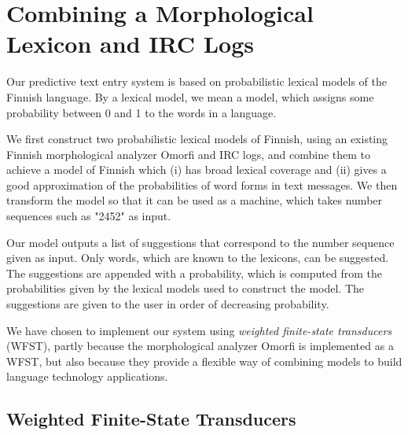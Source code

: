 \documentclass[a4paper,conference]{IEEEtran}
\begin{document}
\section{Combining a Morphological Lexicon and IRC Logs}
\label{sec:methods}

Our predictive text entry system is based on probabilistic lexical
models of the Finnish language. By a lexical model, we mean a model,
which assigns some probability between 0 and 1 to the words in a
language.

We first construct two probabilistic lexical models of Finnish,
using an existing Finnish morphological analyzer Omorfi and IRC logs, and combine
them to achieve a model of Finnish which (i) has broad lexical
coverage and (ii) gives a good approximation of the probabilities of
word forms in text messages. We then transform the model so that it
can be used as a machine, which takes number sequences such as "2452"
as input. 

Our model outputs a list of suggestions that correspond to the number
sequence given as input. Only words, which are known to the lexicons,
can be suggested. The suggestions are appended with a probability, which is
computed from the probabilities given by the lexical models used to
construct the model. The suggestions are given to the user in order of
decreasing probability.

We have chosen to implement our system using {\it weighted finite-state
transducers} (WFST), partly because the morphological analyzer Omorfi is
implemented as a WFST, but also because they provide a flexible way of
combining models to build language technology applications.

\subsection{Weighted Finite-State Transducers}

\end{document}

